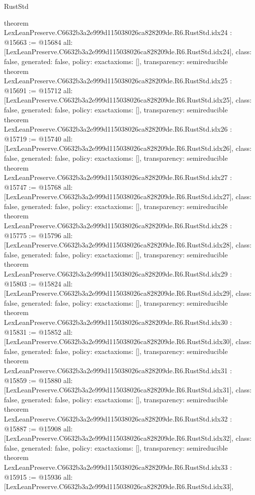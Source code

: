 \begin{lexlean}{RustStd}
\begin{coremodule}
{}
theorem LexLeanPreserve.C6632b3a2e999d115038026ca828209de.R6.RustStd.idx24 : @15663 := @15684 {
  all: [LexLeanPreserve.C6632b3a2e999d115038026ca828209de.R6.RustStd.idx24],
  class: false,
  generated: false,
  policy: exact{axioms: []},
  transparency: semireducible
}
theorem LexLeanPreserve.C6632b3a2e999d115038026ca828209de.R6.RustStd.idx25 : @15691 := @15712 {
  all: [LexLeanPreserve.C6632b3a2e999d115038026ca828209de.R6.RustStd.idx25],
  class: false,
  generated: false,
  policy: exact{axioms: []},
  transparency: semireducible
}
theorem LexLeanPreserve.C6632b3a2e999d115038026ca828209de.R6.RustStd.idx26 : @15719 := @15740 {
  all: [LexLeanPreserve.C6632b3a2e999d115038026ca828209de.R6.RustStd.idx26],
  class: false,
  generated: false,
  policy: exact{axioms: []},
  transparency: semireducible
}
theorem LexLeanPreserve.C6632b3a2e999d115038026ca828209de.R6.RustStd.idx27 : @15747 := @15768 {
  all: [LexLeanPreserve.C6632b3a2e999d115038026ca828209de.R6.RustStd.idx27],
  class: false,
  generated: false,
  policy: exact{axioms: []},
  transparency: semireducible
}
theorem LexLeanPreserve.C6632b3a2e999d115038026ca828209de.R6.RustStd.idx28 : @15775 := @15796 {
  all: [LexLeanPreserve.C6632b3a2e999d115038026ca828209de.R6.RustStd.idx28],
  class: false,
  generated: false,
  policy: exact{axioms: []},
  transparency: semireducible
}
theorem LexLeanPreserve.C6632b3a2e999d115038026ca828209de.R6.RustStd.idx29 : @15803 := @15824 {
  all: [LexLeanPreserve.C6632b3a2e999d115038026ca828209de.R6.RustStd.idx29],
  class: false,
  generated: false,
  policy: exact{axioms: []},
  transparency: semireducible
}
theorem LexLeanPreserve.C6632b3a2e999d115038026ca828209de.R6.RustStd.idx30 : @15831 := @15852 {
  all: [LexLeanPreserve.C6632b3a2e999d115038026ca828209de.R6.RustStd.idx30],
  class: false,
  generated: false,
  policy: exact{axioms: []},
  transparency: semireducible
}
theorem LexLeanPreserve.C6632b3a2e999d115038026ca828209de.R6.RustStd.idx31 : @15859 := @15880 {
  all: [LexLeanPreserve.C6632b3a2e999d115038026ca828209de.R6.RustStd.idx31],
  class: false,
  generated: false,
  policy: exact{axioms: []},
  transparency: semireducible
}
theorem LexLeanPreserve.C6632b3a2e999d115038026ca828209de.R6.RustStd.idx32 : @15887 := @15908 {
  all: [LexLeanPreserve.C6632b3a2e999d115038026ca828209de.R6.RustStd.idx32],
  class: false,
  generated: false,
  policy: exact{axioms: []},
  transparency: semireducible
}
theorem LexLeanPreserve.C6632b3a2e999d115038026ca828209de.R6.RustStd.idx33 : @15915 := @15936 {
  all: [LexLeanPreserve.C6632b3a2e999d115038026ca828209de.R6.RustStd.idx33],
}
\end{coremodule}
\end{lexlean}
